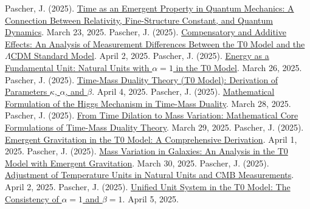 \documentclass[12pt,a4paper]{article}
\begin{document}
	
	\begin{thebibliography}{99}
		 Pascher, J. (2025). \href{https://github.com/jpascher/T0-Time-Mass-Duality/tree/main/2/pdf/English/ZeitEmergentQMEn.pdf}{Time as an Emergent Property in Quantum Mechanics: A Connection Between Relativity, Fine-Structure Constant, and Quantum Dynamics}. March 23, 2025.
		 Pascher, J. (2025). \href{https://github.com/jpascher/T0-Time-Mass-Duality/tree/main/2/pdf/English/MessdifferenzenT0StandardEn.pdf}{Compensatory and Additive Effects: An Analysis of Measurement Differences Between the T0 Model and the \(\Lambda\)CDM Standard Model}. April 2, 2025.
		 Pascher, J. (2025). \href{https://github.com/jpascher/T0-Time-Mass-Duality/tree/main/2/pdf/English/NatEinheitenAlpha1En.pdf}{Energy as a Fundamental Unit: Natural Units with \(\alpha = 1\) in the T0 Model}. March 26, 2025.
		 Pascher, J. (2025). \href{https://github.com/jpascher/T0-Time-Mass-Duality/tree/main/2/pdf/English/ZeitMasseT0ParamsEn.pdf}{Time-Mass Duality Theory (T0 Model): Derivation of Parameters \(\kappa\), \(\alpha\), and \(\beta\)}. April 4, 2025.
		 Pascher, J. (2025). \href{https://github.com/jpascher/T0-Time-Mass-Duality/tree/main/2/pdf/English/MathHiggsZeitMasseEn.pdf}{Mathematical Formulation of the Higgs Mechanism in Time-Mass Duality}. March 28, 2025.
		 Pascher, J. (2025). \href{https://github.com/jpascher/T0-Time-Mass-Duality/tree/main/2/pdf/English/MathZeitMasseLagrangeEn.pdf}{From Time Dilation to Mass Variation: Mathematical Core Formulations of Time-Mass Duality Theory}. March 29, 2025.
		 Pascher, J. (2025). \href{https://github.com/jpascher/T0-Time-Mass-Duality/tree/main/2/pdf/English/EmergentGravT0En.pdf}{Emergent Gravitation in the T0 Model: A Comprehensive Derivation}. April 1, 2025.
		 Pascher, J. (2025). \href{https://github.com/jpascher/T0-Time-Mass-Duality/tree/main/2/pdf/English/MassVarGalaxienEn.pdf}{Mass Variation in Galaxies: An Analysis in the T0 Model with Emergent Gravitation}. March 30, 2025.
 Pascher, J. (2025). \href{https://github.com/jpascher/T0-Time-Mass-Duality/tree/main/2/pdf/English/TempEinheitenCMBEn.pdf}{Adjustment of Temperature Units in Natural Units and CMB Measurements}. April 2, 2025.
		 Pascher, J. (2025). \href{https://github.com/jpascher/T0-Time-Mass-Duality/tree/main/2/pdf/English/Alpha1Beta1KonsistenzEn.pdf}{Unified Unit System in the T0 Model: The Consistency of \(\alpha = 1\) and \(\beta = 1\)}. April 5, 2025.

\end{thebibliography}
\end{document}
